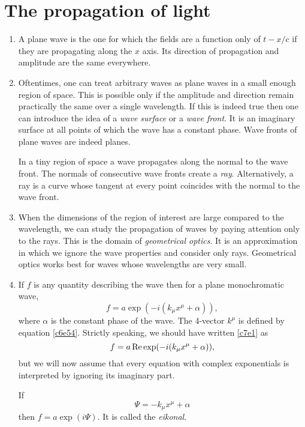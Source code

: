 \chapter{The propagation of light}\label{c7}
\begin{enumerate}
\item A plane wave is the one for which the fields are a function only of $t - 
x/c$ if they are propagating along the $x$ axis. Its direction of propagation 
and amplitude are the same everywhere.

\item Oftentimes, one can treat arbitrary waves as plane waves in a small enough
region of space. This is possible only if the amplitude and direction remain 
practically the same over a single wavelength. If this is indeed true then one 
can introduce the idea of a \emph{wave surface} or a \emph{wave front}. It is an
imaginary surface at all points of which the wave has a constant phase. Wave 
fronts of plane waves are indeed planes.

In a tiny region of space a wave propagates along the normal to the wave front.
The normals of consecutive wave fronts create a \emph{ray}. Alternatively, a ray
is a curve whose tangent at every point coincides with the normal to the wave
front.

\item When the dimensions of the region of interest are large compared to the
wavelength, we can study the propagation of waves by paying attention only to
the rays. This is the domain of \emph{geometrical optics}. It is an approximation
in which we ignore the wave properties and consider only rays. Geometrical optics
works best for waves whose wavelengths are very small.

\item If $f$ is any quantity describing the wave then for a plane monochromatic 
wave,
\begin{equation}\label{c7e1}
f = a\exp(-i(k_\mu x^\mu + \alpha)),
\end{equation}
where $\alpha$ is the constant phase of the wave. The 4-vector $k^\mu$ is defined
by equation \eqref{c6e54}. Strictly speaking, we should have written \eqref{c7e1}
as
\[
f = a\operatorname{Re}{\exp(-i(k_\mu x^\mu + \alpha))},
\]
but we will now assume that every equation with complex exponentials is 
interpreted by ignoring its imaginary part.

If 
\begin{equation}\label{c7e2}
\Psi = -k_\mu x^\mu + \alpha
\end{equation}
then $f = a\exp(i\Psi)$. It is called the \emph{eikonal}.


\end{enumerate}
